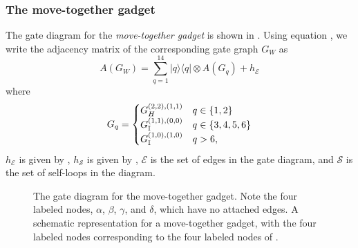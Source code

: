 \documentclass[../thesis-main/thesis-main]{subfiles}
\begin{document}
\subsubsection{The move-together gadget}


The gate diagram for the \emph{move-together gadget} is shown in . Using equation , we write the adjacency matrix of the corresponding gate graph $G_W$ as 
\begin{equation}
A(G_W)=\sum_{q=1}^{14}|q\rangle\langle q|\otimes A(G_q)+h_{\mathcal{E}}\label{eq:move_together_adj}
\end{equation}
where
\begin{equation}
  G_q = \begin{cases}
    G_H^{(2,2),(1,1)} & q \in \{1,2\}\\
    G_{\mathbb{I}}^{(1,1),(0,0)} & q\in \{3,4,5,6\}\\
    G_{\mathbb{I}}^{(1,0),(1,0)} & q > 6,
  \end{cases}
\end{equation}
$h_{\mathcal{E}}$ is given by , $h_{\mathcal{S}}$ is given by ,  $\mathcal{E}$ is the set of edges in the gate diagram, and $\mathcal{S}$ is the set of self-loops in the diagram.

\begin{figure}
\centering 
{}
\hspace{1cm}
\caption[Move-together gadget]{ The gate diagram for the move-together gadget.  Note the four labeled nodes, $\alpha$, $\beta$, $\gamma$, and $\delta$, which have no attached edges.   A schematic representation for a move-together gadget, with the four labeled nodes corresponding to the four labeled nodes of . \label{fig:W_gadget}} 
\end{figure}
\end{document}
